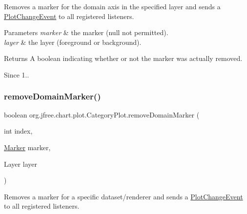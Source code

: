 Removes a marker for the domain axis in the specified layer and sends a \mbox{\hyperlink{}{Plot\+Change\+Event}} to all registered listeners.


\begin{DoxyParams}{Parameters}
{\em marker} & the marker ({\ttfamily null} not permitted). \\
\hline
{\em layer} & the layer (foreground or background).\\
\hline
\end{DoxyParams}
\begin{DoxyReturn}{Returns}
A boolean indicating whether or not the marker was actually removed.
\end{DoxyReturn}
\begin{DoxySince}{Since}
1.. 
\end{DoxySince}
\mbox{\label{classorg_1_1jfree_1_1chart_1_1plot_1_1_category_plot_ac914fcb2271aaed1fb7f1af448b7b593}} 
\subsubsection{\texorpdfstring{remove\+Domain\+Marker()}{removeDomainMarker()}\hspace{0.1cm}{\footnotesize\ttfamily [3/4]}}
{\footnotesize\ttfamily boolean org.\+jfree.\+chart.\+plot.\+Category\+Plot.\+remove\+Domain\+Marker (\begin{DoxyParamCaption}\item[{int}]{index,  }\item[{\mbox{\hyperlink{classorg_1_1jfree_1_1chart_1_1plot_1_1_marker}{Marker}}}]{marker,  }\item[{Layer}]{layer }\end{DoxyParamCaption})}

Removes a marker for a specific dataset/renderer and sends a \mbox{\hyperlink{}{Plot\+Change\+Event}} to all registered listeners.


